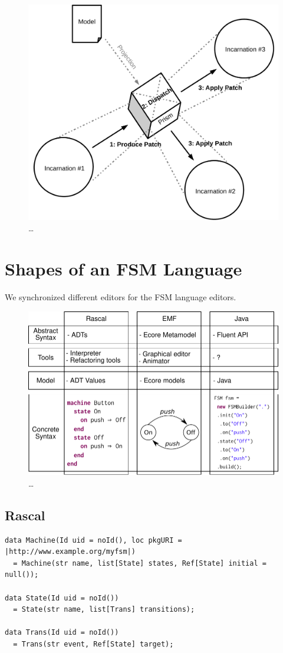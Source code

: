 \documentclass[sigplan]{acmart}
\begin{document}
\begin{figure}
	\centering
	\includegraphics[width=.6\columnwidth]{figures/prism}
	\caption{\dots}
	\label{fig:prism}
\end{figure}

\section{Shapes of an FSM Language}

We synchronized different editors for the FSM language editors.

\begin{figure}
	\centering
	\includegraphics[width=\columnwidth]{figures/concepts-instantiated}
	\caption{\dots}
	\label{fig:concepts-instantiated}
\end{figure}

\subsection{Rascal}
\begin{minipage}{\columnwidth}
\begin{lstlisting}[label=lst:fsm-adt, caption={FSM in Rascal}, language=Rascal]
data Machine(Id uid = noId(), loc pkgURI = |http://www.example.org/myfsm|)
  = Machine(str name, list[State] states, Ref[State] initial = null());

data State(Id uid = noId())
  = State(str name, list[Trans] transitions);

data Trans(Id uid = noId())
  = Trans(str event, Ref[State] target);
\end{lstlisting}
\end{minipage}
\end{document}
